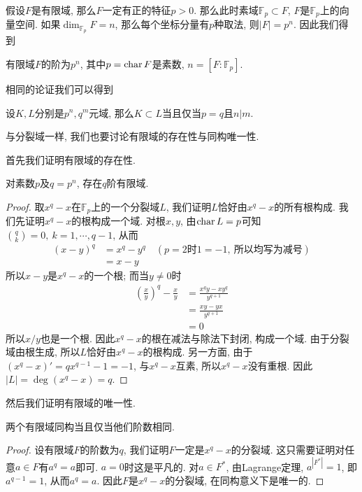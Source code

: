 假设$F$是有限域, 那么$F$一定有正的特征$p>0$.
那么此时素域$\mathbb{F}_p\subset F$, $F$是$\mathbb{F}_p$上的向量空间.
如果$\dim_{\mathbb{F}_p}F=n$, 那么每个坐标分量有$p$种取法, 则$|F|=p^n$.
因此我们得到
\begin{prop}
    有限域$F$的阶为$p^n$, 其中$p=\operatorname{char}{F}$是素数, $n=[F:\mathbb{F}_p]$.
\end{prop}

相同的论证我们可以得到
\begin{prop}\label{finite subfield}
    设$K,L$分别是$p^n,q^m$元域, 那么$K\subset L$当且仅当$p=q$且$n|m$.
\end{prop}

与分裂域一样, 我们也要讨论有限域的存在性与同构唯一性.

首先我们证明有限域的存在性.
\begin{thm}
    对素数$p$及$q=p^n$, 存在$q$阶有限域.
\end{thm}
\begin{proof}
    取$x^q-x$在$\mathbb{F}_p$上的一个分裂域$L$, 我们证明$L$恰好由$x^q-x$的所有根构成.
    我们先证明$x^q-x$的根构成一个域.
    对根$x,y$, 由$\operatorname{char} L=p$可知$\binom{q}{k}=0,\ k=1,\cdots,q-1$, 从而
    \begin{align*}
        (x-y)^q&=x^q-y^q\quad(p=2\text{时}1=-1,\ \text{所以均写为减号})\\
        &=x-y
    \end{align*}
    所以$x-y$是$x^q-x$的一个根;
    而当$y\neq 0$时
    \begin{align*}
        \left(\frac{x}{y}\right)^q-\frac{x}{y}&=\frac{x^qy-xy^q}{y^{q+1}}\\
        &=\frac{xy-yx}{y^{q+1}}\\
        &=0
    \end{align*}
    所以$x/y$也是一个根.
    因此$x^q-x$的根在减法与除法下封闭, 构成一个域.
    由于分裂域由根生成, 所以$L$恰好由$x^q-x$的根构成.
    另一方面, 由于$(x^q-x)'=qx^{q-1}-1=-1$, 与$x^q-x$互素, 所以$x^q-x$没有重根.
    因此$|L|=\deg(x^q-x)=q$.
\end{proof}

然后我们证明有限域的唯一性.
\begin{thm}
    两个有限域同构当且仅当他们阶数相同.
\end{thm}
\begin{proof}
    设有限域$F$的阶数为$q$, 我们证明$F$一定是$x^q-x$的分裂域.
    这只需要证明对任意$a\in F$有$a^q=a$即可.
    $a=0$时这是平凡的.
    对$a\in F^*$, 由Lagrange定理, $a^{|F^*|}=1$, 即$a^{q-1}=1$, 从而$a^q=a$.
    因此$F$是$x^q-x$的分裂域, 在同构意义下是唯一的.
\end{proof}

